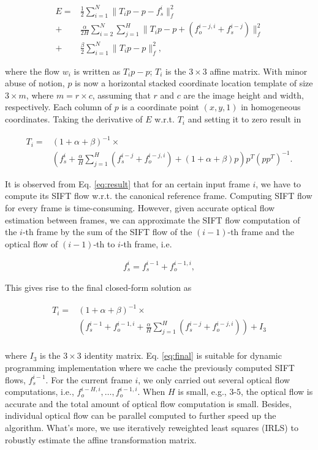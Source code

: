 \documentclass[10pt,journal]{IEEEtran}
\begin{document}
\begin{align}
	\label{data_affine}
E		=&\frac{1}{2}\sum_{i=1}^{N}\parallel{T_ip-p-f_s^i}\parallel_f^2
\\\label{smooth_affine}
				+&\frac{\alpha}{2H}\sum_{i=2}^{N}\sum_{j=1}^{H}\parallel{T_ip-p+(f_o^{i-j,i}+f_s^{i-j})}\parallel_f^2
\\\label{penalty_affine}
				+&\frac{\beta}{2}\sum_{i=1}^{N}\parallel{T_ip-p}\parallel_f^2,
\end{align} 

\noindent where the flow $w_i$ is written as $T_ip-p$; $T_i$ is the $3\times3$ affine matrix. With minor
 abuse of notion, $p$ is now a horizontal stacked coordinate location template of size $3\times m$, where $m=r\times c$, assuming that $r$ and $c$ are the image height and width, respectively. Each column of $p$ is a coordinate point $(x,y,1)$ in homogeneous coordinates. Taking the derivative of $E$ w.r.t. $T_i$ and setting it to zero result in 

\begin{align}
\label{eq:result}
T_i=&(1+\alpha+\beta)^{-1}\times \nonumber \\
		&(f_s^i+\frac{\alpha}{H}\sum_{j=1}^H(f_s^{i-j}+f_o^{i-j,i})+(1+\alpha+\beta)p)p^T(pp^T)^{-1}.
\end{align}

It is observed from Eq. \ref{eq:result} that for an certain input frame $i$, we have to compute its SIFT flow w.r.t. the canonical reference frame. Computing SIFT flow for every frame is time-consuming. However, given accurate optical flow estimation between frames, we can approximate the SIFT flow computation of the $i$-th frame by the sum of the SIFT flow of the $(i-1)$-th frame and the optical flow of $(i-1)$-th to $i$-th frame, i.e.

\begin{align}
\label{eq:approx}
f_s^i=f_s^{i-1}+f_o^{i-1,i},
\end{align}

This gives rise to the final closed-form solution as

\begin{align}
\label{eq:final}
T_i=&(1+\alpha+\beta)^{-1}\times \nonumber \\
		&(f_s^{i-1}+f_o^{i-1,i}+\frac{\alpha}{H}\sum_{j=1}^H(f_s^{i-j}+f_o^{i-j,i})) + I_3 \nonumber \\
\end{align}

\noindent where $I_3$ is the $3\times 3$ identity matrix. Eq. \ref{eq:final} is suitable for dynamic programming implementation where we cache the previously computed SIFT flows, $f_s^{i-1}$. For the current frame $i$, we only carried out several optical flow computations, i.e., $f_o^{i-H,i},\ldots,f_o^{i-1,i}$. When $H$ is small, e.g., $3$-$5$, the optical flow is accurate and the total amount of optical flow computation is small. Besides, individual optical flow can be parallel computed to further speed up the algorithm. What's more, we use iteratively reweighted least squares (IRLS) \cite{Huber81} to robustly estimate the affine transformation matrix. 
\end{document}
